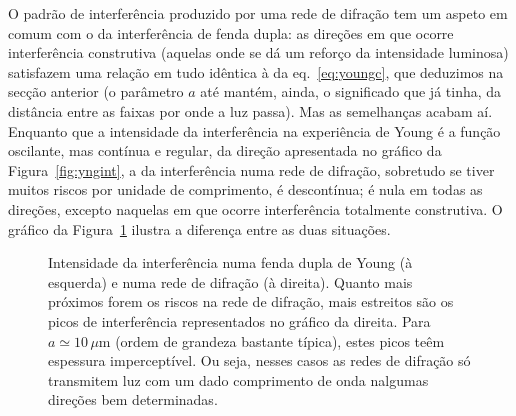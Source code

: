 O padrão de interferência produzido por uma rede de difração tem um aspeto em
comum com o da interferência de fenda dupla: as direções em que ocorre
interferência construtiva (aquelas onde se dá um reforço da intensidade
luminosa) satisfazem uma relação em tudo idêntica à da
eq.~\eqref{eq:youngc}, que deduzimos na secção anterior (o parâmetro $a$
até mantém, ainda, o significado que já tinha, da distância entre as faixas por
onde a luz passa). Mas as semelhanças acabam aí. Enquanto que a intensidade da
interferência na experiência de Young é a função oscilante, mas contínua e
regular, da direção apresentada no gráfico da Figura~\ref{fig:yngint}, a da
interferência numa rede de difração, sobretudo se tiver muitos riscos por
unidade de comprimento, é descontínua; é nula em todas as direções, excepto
naquelas em que ocorre interferência totalmente construtiva. O gráfico da
Figura~\ref{fig:gratingi} ilustra a diferença entre as duas situações.
\begin{figure}[htb]
{\centering
  \par
}
\caption{\label{fig:gratingi}Intensidade da interferência numa fenda dupla de
Young (à esquerda) e numa rede de difração (à direita). Quanto mais próximos
forem os riscos na rede de difração, mais estreitos são os picos de
interferência representados no gráfico da direita. Para $a\simeq 10\,\mu$m
(ordem de grandeza bastante típica), estes picos teêm espessura imperceptível.
Ou seja, nesses casos as redes de difração só transmitem luz com um dado
comprimento de onda nalgumas direções bem determinadas.}
\end{figure}


